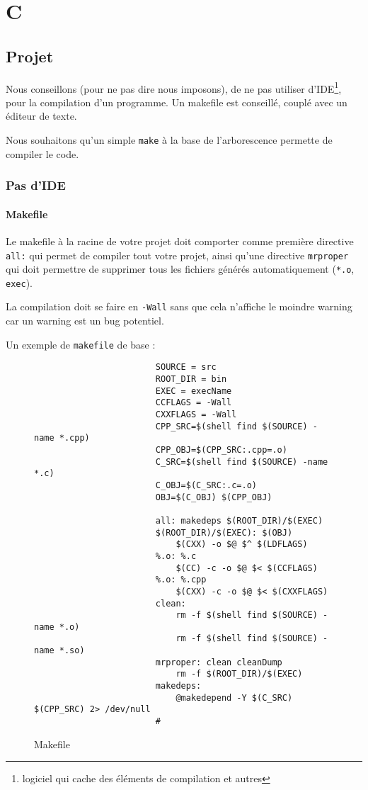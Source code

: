 \chapter{C}
	\section{Projet}
		Nous conseillons (pour ne pas dire nous imposons), de ne pas utiliser d'IDE\footnote{logiciel qui cache des éléments de compilation et autres}, pour la compilation d'un programme. Un makefile est conseillé, couplé avec un éditeur de texte.

		Nous souhaitons qu'un simple \verb+make+ à la base de l'arborescence permette de compiler le code.

		\subsection{Pas d'IDE}
			\subsubsection{Makefile}
				Le makefile à la racine de votre projet doit comporter comme première directive \verb+all:+ qui permet de compiler tout votre projet, ainsi qu'une directive \verb+mrproper+ qui doit permettre de supprimer tous les fichiers générés automatiquement (\verb+*.o+, \verb+exec+).

				La compilation doit se faire en \verb+-Wall+ sans que cela n’affiche le moindre warning car un warning est un bug potentiel.

				Un exemple de \verb+makefile+ de base :

				\begin{figure}[H]
					\begin{changemargin}{-2.5cm}{-2.5cm}
					\begin{tcolorbox}
					\begin{verbatim}
						SOURCE = src
						ROOT_DIR = bin
						EXEC = execName
						CCFLAGS = -Wall
						CXXFLAGS = -Wall
						CPP_SRC=$(shell find $(SOURCE) -name *.cpp)
						CPP_OBJ=$(CPP_SRC:.cpp=.o)
						C_SRC=$(shell find $(SOURCE) -name *.c)
						C_OBJ=$(C_SRC:.c=.o)
						OBJ=$(C_OBJ) $(CPP_OBJ)

						all: makedeps $(ROOT_DIR)/$(EXEC)
						$(ROOT_DIR)/$(EXEC): $(OBJ)
						    $(CXX) -o $@ $^ $(LDFLAGS)
						%.o: %.c
						    $(CC) -c -o $@ $< $(CCFLAGS)
						%.o: %.cpp
						    $(CXX) -c -o $@ $< $(CXXFLAGS)
						clean:
						    rm -f $(shell find $(SOURCE) -name *.o)
						    rm -f $(shell find $(SOURCE) -name *.so)
						mrproper: clean cleanDump
						    rm -f $(ROOT_DIR)/$(EXEC)
						makedeps:
						    @makedepend -Y $(C_SRC) $(CPP_SRC) 2> /dev/null
					    #
					\end{verbatim}
					\end{tcolorbox}
					\end{changemargin}
					\caption{Makefile}
				\end{figure}

